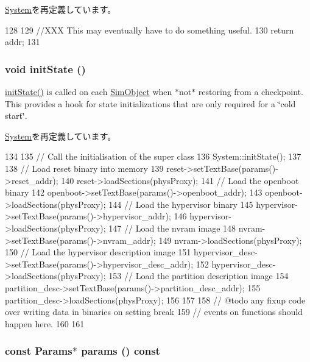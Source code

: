 \hyperlink{classSystem_aff94f650c5eef23b8dc350ea755bdef4}{System}を再定義しています。


\begin{DoxyCode}
128     {
129         //XXX This may eventually have to do something useful.
130         return addr;
131     }
\end{DoxyCode}
\hypertarget{classSparcSystem_a3c34ea9b29f410748d4435a667484924}{
\subsubsection[{initState}]{\setlength{\rightskip}{0pt plus 5cm}void initState ()}}
\label{classSparcSystem_a3c34ea9b29f410748d4435a667484924}
\hyperlink{classSparcSystem_a3c34ea9b29f410748d4435a667484924}{initState()} is called on each \hyperlink{classSimObject}{SimObject} when $\ast$not$\ast$ restoring from a checkpoint. This provides a hook for state initializations that are only required for a \char`\"{}cold start\char`\"{}. 

\hyperlink{classSystem_a3c34ea9b29f410748d4435a667484924}{System}を再定義しています。


\begin{DoxyCode}
134 {
135     // Call the initialisation of the super class
136     System::initState();
137 
138     // Load reset binary into memory
139     reset->setTextBase(params()->reset_addr);
140     reset->loadSections(physProxy);
141     // Load the openboot binary
142     openboot->setTextBase(params()->openboot_addr);
143     openboot->loadSections(physProxy);
144     // Load the hypervisor binary
145     hypervisor->setTextBase(params()->hypervisor_addr);
146     hypervisor->loadSections(physProxy);
147     // Load the nvram image
148     nvram->setTextBase(params()->nvram_addr);
149     nvram->loadSections(physProxy);
150     // Load the hypervisor description image
151     hypervisor_desc->setTextBase(params()->hypervisor_desc_addr);
152     hypervisor_desc->loadSections(physProxy);
153     // Load the partition description image
154     partition_desc->setTextBase(params()->partition_desc_addr);
155     partition_desc->loadSections(physProxy);
156 
157 
158     // @todo any fixup code over writing data in binaries on setting break
159     // events on functions should happen here.
160 
161 }
\end{DoxyCode}
\hypertarget{classSparcSystem_acd3c3feb78ae7a8f88fe0f110a718dff}{
\subsubsection[{params}]{\setlength{\rightskip}{0pt plus 5cm}const {\bf Params}$\ast$ params () const}}
\label{classSparcSystem_acd3c3feb78ae7a8f88fe0f110a718dff}


